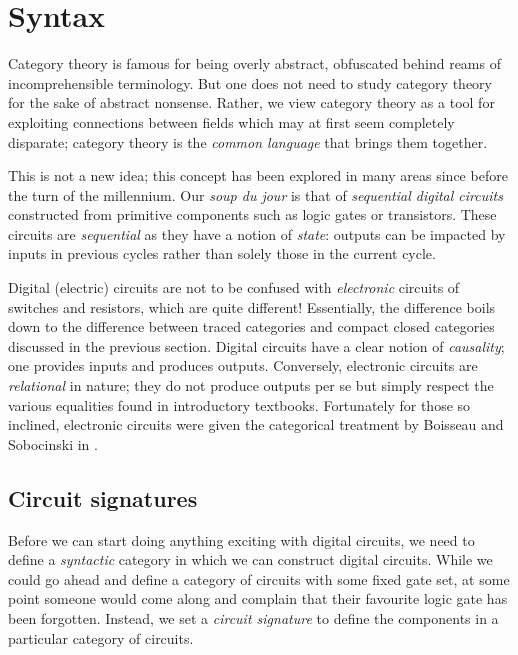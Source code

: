\chapter{Syntax}

Category theory is famous for being overly abstract, obfuscated
behind reams of incomprehensible terminology.
But one does not need to study category theory for the sake of abstract
nonsense.
Rather, we view category theory as a tool for exploiting connections
between fields which may at first seem completely disparate; category theory is
the \emph{common language} that brings them together.

This is not a new idea; this concept has been explored in many areas since
before the turn of the millennium.
Our \emph{soup du jour} is that of \emph{sequential digital circuits}
constructed from primitive components such as logic gates or transistors.
These circuits are \emph{sequential} as they have a notion of \emph{state}:
outputs can be impacted by inputs in previous cycles rather than solely those in
the current cycle.

\begin{remark}
    Digital (electric) circuits are not to be confused with \emph{electronic}
    circuits of switches and resistors, which are quite different!
    Essentially, the difference boils down to the difference between traced
    categories and compact closed categories discussed in the previous section.
    Digital circuits have a clear notion of \emph{causality}; one provides
    inputs and produces outputs.
    Conversely, electronic circuits are \emph{relational} in nature; they do not
    produce outputs per se but simply respect the various equalities found in
    introductory textbooks.
    Fortunately for those so inclined, electronic circuits were given the
    categorical treatment by Boisseau and Sobocinski in
    \cite{boisseau2022string}.
\end{remark}

\section{Circuit signatures}

Before we can start doing anything exciting with digital circuits, we need to
define a \emph{syntactic} category in which we can construct digital circuits.
While we could go ahead and define a category of circuits with some fixed gate
set, at some point someone would come along and complain that their favourite
logic gate has been forgotten.
Instead, we set a \emph{circuit signature} to define the components in a
particular category of circuits.

